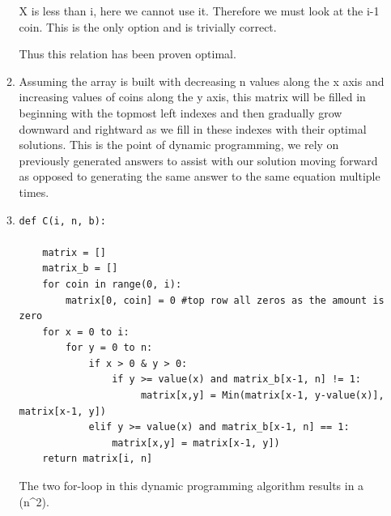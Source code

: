 \documentclass[12pt]{article}
\begin{document}
\begin{enumerate}
\begin{enumerate}
        
    X is less than i, here we cannot use it. Therefore we must look at the i-1 coin. This is the only option and is trivially correct.
        
    
    Thus this relation has been proven optimal. 
    
    
    \item
    Assuming the array is built with decreasing n values along the x axis and increasing values of coins along the y axis, this matrix will be filled in beginning with the topmost left indexes and then gradually grow downward and rightward as we fill in these indexes with their optimal solutions. This is the point of dynamic programming, we rely on previously generated answers to assist with our solution moving forward as opposed to generating the same answer to the same equation multiple times. 
    
    \item
    
    \begin{verbatim}
def C(i, n, b):

	matrix = []
	matrix_b = []
	for coin in range(0, i):
	    matrix[0, coin] = 0 #top row all zeros as the amount is zero
	for x = 0 to i:
	    for y = 0 to n:
	        if x > 0 & y > 0:
	            if y >= value(x) and matrix_b[x-1, n] != 1:
	                 matrix[x,y] = Min(matrix[x-1, y-value(x)], matrix[x-1, y])
            elif y >= value(x) and matrix_b[x-1, n] == 1:
                matrix[x,y] = matrix[x-1, y])
	return matrix[i, n]
    \end{verbatim}
    
    The two for-loop in this dynamic programming algorithm results in a \theta (n^{2}).
\end{enumerate}

\end{enumerate}
\end{document}

